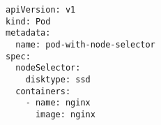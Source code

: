 \begin{verbatim}
apiVersion: v1
kind: Pod
metadata:
  name: pod-with-node-selector
spec:
  nodeSelector:
    disktype: ssd
  containers:
    - name: nginx
      image: nginx
\end{verbatim}